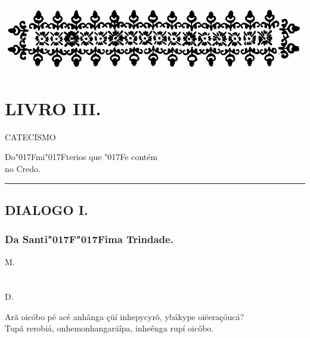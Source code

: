 \documentclass[openany,titlepage,12pt]{book}
\renewcommand{\chaptermark}[1]{\markboth{#1}{}}
\renewcommand{\sectionmark}[1]{\gdef\rightmark{#1}}
\newcommand{\lgS}{\char"017F}
\newcommand{\lgSS}{\char"017F\char"017F}
\begin{document}
\begin{center}
    \vspace*{20pt}
    \includegraphics[scale=0.33]{12.livro3.png}
\end{center}
\unskip
\vspace{-30pt}
{\let\clearpage\relax \chapter{\Huge LIVRO III.}}
\unskip
\vspace{-2pt}
\begin{center}
    {\large CATECISMO}
\end{center}
\unskip
\begin{center}
    Do\lgS mi\lgS terios que \lgS e contém\\
    no Credo.
\end{center}
\unskip
\par\noindent\rule{\textwidth}{0.4pt}
\unskip\vspace{-3pt}
\section{DIALOGO I.}
\unskip\vspace{-3pt}
\subsection{Da Santi\lgSS ima Trindade.}
\chaptermark{Dialogo I.}
\sectionmark{Da Santi\lgSS ima Trindade.}

\hspace{-10pt}
\begin{minipage}[t]{0.03\linewidth}
    M.\\ \\ \\D.\\ 
\end{minipage}
\begin{minipage}[t]{1.08\linewidth}
    \lettrine
    [findent =-2pt, nindent=0pt, loversize=-0.2, lraise=0.05, lines=5]
    {}{A}rã oicóbo pé acé anhânga
    çüí inhepycyrõ, ybákype
    oiëeraçóucá?\\
    Tupã rerobiá, onhemonhangaräîpa, inheênga rupí oicôbo.
\end{minipage}\\
\end{document}
